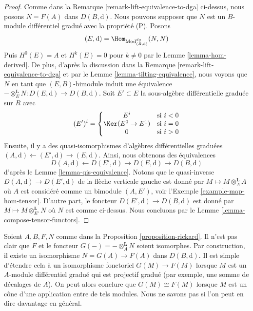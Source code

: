\begin{proof}
Comme dans la Remarque \ref{remark-lift-equivalence-to-dga} ci-dessus, nous posons
$N = F(A)$ dans $D(B, \text{d})$. Nous pouvons supposer que $N$ est un $B$-module
différentiel gradué avec la propriété (P). Posons
$$
(E, \text{d}) = \Hom_{\text{Mod}^{dg}_{(B, \text{d})}}(N, N)
$$
Puis $H^0(E) = A$ et $H^k(E) = 0$ pour $k \not = 0$ par le Lemme
\ref{lemma-hom-derived}. De plus, d'après la discussion dans la Remarque
\ref{remark-lift-equivalence-to-dga} et par le Lemme
\ref{lemma-tilting-equivalence}, nous voyons que $N$ en tant que $(E, B)$-bimodule
induit une équivalence $- \otimes_E^\mathbf{L} N : D(E, \text{d}) \to D(B,
\text{d})$. Soit $E' \subset E$ la sous-algèbre différentielle graduée sur $R$ avec
$$
(E')^i = \left\{
\begin{matrix}
E^i & \text{si }i < 0 \\
\Ker(E^0 \to E^1) & \text{si }i = 0 \\
0 & \text{si }i > 0
\end{matrix}
\right.
$$
Ensuite, il y a des quasi-isomorphismes d'algèbres différentielles graduées $(A,
\text{d}) \leftarrow (E', \text{d}) \rightarrow (E, \text{d})$. Ainsi, nous
obtenons des équivalences
$$
D(A, \text{d}) \leftarrow D(E', \text{d}) \rightarrow D(E, \text{d})
\rightarrow D(B, \text{d})
$$
d'après le Lemme \ref{lemma-qis-equivalence}. Notons que le quasi-inverse $D(A,
\text{d}) \to D(E', \text{d})$ de la flèche verticale gauche est donné par $M
\mapsto M \otimes_A^\mathbf{L} A$ où $A$ est considéré comme un bimodule $(A,
E')$, voir l'Exemple \ref{example-map-hom-tensor}. D'autre part, le foncteur
$D(E', \text{d}) \to D(B, \text{d})$ est donné par $M \mapsto M
\otimes_{E'}^\mathbf{L} N$ où $N$ est comme ci-dessus. Nous concluons par le Lemme
\ref{lemma-compose-tensor-functors}.
\end{proof}

\begin{remark}
\label{remark-rickard}
Soient $A, B, F, N$ comme dans la Proposition \ref{proposition-rickard}. Il n'est
pas clair que $F$ et le foncteur $G(-) = - \otimes_A^\mathbf{L} N$ soient
isomorphes. Par construction, il existe un isomorphisme $N = G(A) \to F(A)$ dans
$D(B, \text{d})$. Il est simple d'étendre cela à un isomorphisme fonctoriel $G(M)
\to F(M)$ lorsque $M$ est un $A$-module différentiel gradué qui est projectif
gradué (par exemple, une somme de décalages de $A$). On peut alors conclure que
$G(M) \cong F(M)$ lorsque $M$ est un cône d'une application entre de tels modules.
Nous ne savons pas si l'on peut en dire davantage en général.
\end{remark}

